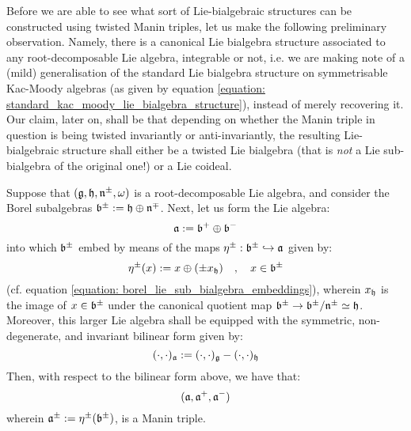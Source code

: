         Before we are able to see what sort of Lie-bialgebraic structures can be constructed using twisted Manin triples, let us make the following preliminary observation. Namely, there is a canonical Lie bialgebra structure associated to any root-decomposable Lie algebra, integrable or not, i.e. we are making note of a (mild) generalisation of the standard Lie bialgebra structure on symmetrisable Kac-Moody algebras (as given by equation \eqref{equation: standard_kac_moody_lie_bialgebra_structure}), instead of merely recovering it. Our claim, later on, shall be that depending on whether the Manin triple in question is being twisted invariantly or anti-invariantly, the resulting Lie-bialgebraic structure shall either be a twisted Lie bialgebra (that is \textit{not} a Lie sub-bialgebra of the original one!) or a Lie coideal.
        \begin{lemma} \label{lemma: root_decomposable_lie_bialgebras}
            Suppose that $(\mathfrak{g}, \mathfrak{h}, \mathfrak{n}^{\pm}, \omega)$ is a root-decomposable Lie algebra, and consider the Borel subalgebras $\mathfrak{b}^{\pm} := \mathfrak{h} \oplus \mathfrak{n}^{\mp}$. Next, let us form the Lie algebra:
                $$\mathfrak{a} := \mathfrak{b}^+ \oplus \mathfrak{b}^-$$
            into which $\mathfrak{b}^{\pm}$ embed by means of the maps $\eta^{\pm}: \mathfrak{b}^{\pm} \hookrightarrow \mathfrak{a}$ given by:
                \begin{equation} \label{equation: root_decomposable_borel_subalgebra_embeddings}
                    \eta^{\pm}(x) := x \oplus ( \pm x_{\mathfrak{h}} ) \quad, \quad x \in \mathfrak{b}^{\pm}
                \end{equation}
            (cf. equation \eqref{equation: borel_lie_sub_bialgebra_embeddings}), wherein $x_{\mathfrak{h}}$ is the image of $x \in \mathfrak{b}^{\pm}$ under the canonical quotient map $\mathfrak{b}^{\pm} \to \mathfrak{b}^{\pm}/\mathfrak{n}^{\pm} \simeq \mathfrak{h}$. Moreover, this larger Lie algebra shall be equipped with the symmetric, non-degenerate, and invariant bilinear form given by:
                \begin{equation} \label{equation: extended_root_decomposable_pairings}
                    (\cdot, \cdot)_{\mathfrak{a}} := (\cdot, \cdot)_{\mathfrak{g}} - (\cdot, \cdot)_{\mathfrak{h}}
                \end{equation}
            Then, with respect to the bilinear form above, we have that:
                \begin{equation} \label{equation: root_decomposable_manin_triples}
                    (\mathfrak{a}, \mathfrak{a}^+, \mathfrak{a}^-)
                \end{equation}
            wherein $\mathfrak{a}^{\pm} := \eta^{\pm}(\mathfrak{b}^{\pm})$, is a Manin triple.
        \end{lemma}
